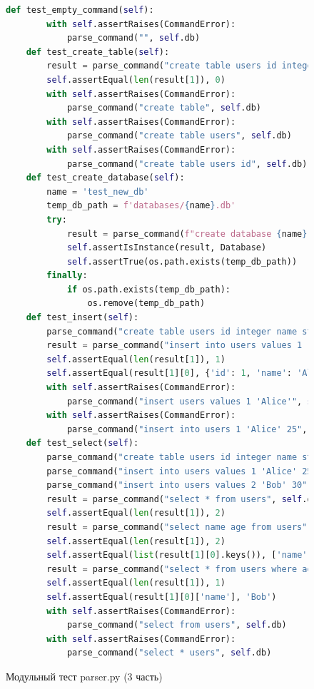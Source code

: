 \begin{figure}[H]
\begin{lstlisting}[language=Python, breaklines=true]	
	def test_empty_command(self):
		with self.assertRaises(CommandError):
			parse_command("", self.db)
	def test_create_table(self):
		result = parse_command("create table users id integer name string age integer", self.db)
		self.assertEqual(len(result[1]), 0)            
		with self.assertRaises(CommandError):
			parse_command("create table", self.db)            
		with self.assertRaises(CommandError):
			parse_command("create table users", self.db)            
		with self.assertRaises(CommandError):
			parse_command("create table users id", self.db)
	def test_create_database(self):
		name = 'test_new_db'
		temp_db_path = f'databases/{name}.db'
		try:
			result = parse_command(f"create database {name}", self.db)
			self.assertIsInstance(result, Database)
			self.assertTrue(os.path.exists(temp_db_path))
		finally:
			if os.path.exists(temp_db_path):
				os.remove(temp_db_path)
	def test_insert(self):
		parse_command("create table users id integer name string age integer", self.db)
		result = parse_command("insert into users values 1 'Alice' 25", self.db)
		self.assertEqual(len(result[1]), 1)
		self.assertEqual(result[1][0], {'id': 1, 'name': 'Alice', 'age': 25})            
		with self.assertRaises(CommandError):
			parse_command("insert users values 1 'Alice'", self.db)            
		with self.assertRaises(CommandError):
			parse_command("insert into users 1 'Alice' 25", self.db)
	def test_select(self):
		parse_command("create table users id integer name string age integer", self.db)
		parse_command("insert into users values 1 'Alice' 25", self.db)
		parse_command("insert into users values 2 'Bob' 30", self.db)        
		result = parse_command("select * from users", self.db)
		self.assertEqual(len(result[1]), 2)        
		result = parse_command("select name age from users", self.db)
		self.assertEqual(len(result[1]), 2)
		self.assertEqual(list(result[1][0].keys()), ['name', 'age'])  
		result = parse_command("select * from users where age > 25", self.db)
		self.assertEqual(len(result[1]), 1)
		self.assertEqual(result[1][0]['name'], 'Bob')            
		with self.assertRaises(CommandError):
			parse_command("select from users", self.db)            
		with self.assertRaises(CommandError):
			parse_command("select * users", self.db)
\end{lstlisting}  
\caption{Модульный тест parser.py (3 часть)}
\label{fig:test_parser_3}
\end{figure}
